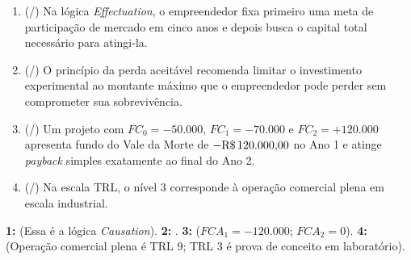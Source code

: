 \begin{boxTeste}
  \begin{enumerate}[leftmargin=1.5em, itemsep=4pt]
    \item (\V/\F) Na lógica \textit{Effectuation}, o empreendedor fixa primeiro uma meta de participação de mercado em cinco anos e depois busca o capital total necessário para atingi-la.
    \item (\V/\F) O princípio da perda aceitável recomenda limitar o investimento experimental ao montante máximo que o empreendedor pode perder sem comprometer sua sobrevivência.
    \item (\V/\F) Um projeto com $FC_0 = -50.000$, $FC_1 = -70.000$ e $FC_2 = +120.000$ apresenta fundo do Vale da Morte de $-\text{R\$\,120.000,00}$ no Ano 1 e atinge \textit{payback} simples exatamente ao final do Ano 2.
    \item (\V/\F) Na escala TRL, o nível 3 corresponde à operação comercial plena em escala industrial.
  \end{enumerate}
  \begin{boxGabarito}
    \textbf{1: \F} (Essa é a lógica \textit{Causation}). \quad \textbf{2: \V}. \quad \textbf{3: \V} ($FCA_1 = -120.000$; $FCA_2 = 0$). \quad \textbf{4: \F} (Operação comercial plena é TRL 9; TRL 3 é prova de conceito em laboratório).
  \end{boxGabarito}
\end{boxTeste}
